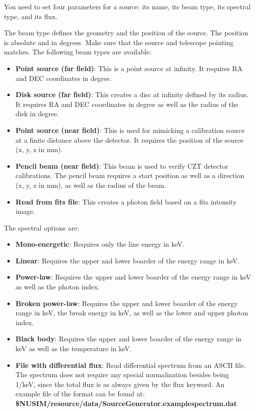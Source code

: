 You need to set four parameters for a source: its name, its beam type, its spectral type, and its flux.

The beam type defines the geometry and the position of the source. The position is absolute and in degrees. Make sure that the source and telescope pointing matches. The following beam types are available:
 \begin{itemize}
 \item \textbf{Point source (far field)}: This is a point source at infinity. It requires RA and DEC coordinates in degree.
 \item \textbf{Disk source (far field)}: This creates a disc at infinity defined by its radius. It requires RA and DEC coordinates in degree as well as the radius of the disk in degree.
 \item \textbf{Point source (near field)}: This is used for mimicking a calibration source at a finite distance above the detector. It requires the position of the source (x, y, z in mm).
 \item \textbf{Pencil beam (near field)}: This beam is used to verify CZT detector calibrations. The pencil beam requires a start position as well as a direction (x, y, z in mm), as well as the radius of the beam.  
 \item \textbf{Read from fits file}: This creates a photon field based on a fits intensity image.
 \end{itemize}
 
The spectral options are:
\begin{itemize} 
\item \textbf{Mono-energetic}: Requires only the line energy in keV.
\item \textbf{Linear}: Requires the upper and lower boarder of the energy range in keV.
\item \textbf{Power-law}: Requires the upper and lower boarder of the energy range in keV as well as the photon index.
\item \textbf{Broken power-law}: Requires the upper and lower boarder of the energy range in keV, the break energy in keV, as well as the lower and upper photon index.
\item \textbf{Black body}: Requires the upper and lower boarder of the energy range in keV as well as the temperature in keV.
\item \textbf{File with differential flux}: Read differential spectrum from an ASCII file. The spectrum does not require any special normalization besides being 1/keV, since the total flux is as always given by the flux keyword. An example file of the format can be found at:\\
\textbf{\${NUSIM}/resource/data/SourceGenerator.examplespectrum.dat}
\end{itemize}

